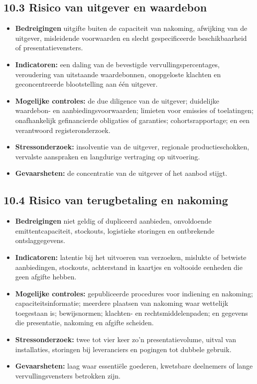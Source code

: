 \documentclass[11pt]{article}
\begin{document}
\subsection*{10.3 Risico van uitgever en waardebon}

\begin{itemize}[leftmargin=*]
\item \textbf{Bedreigingen} uitgifte buiten de capaciteit van nakoming, afwijking van de uitgever, misleidende voorwaarden en slecht gespecificeerde beschikbaarheid of presentatievensters.
\item \textbf{Indicatoren:} een daling van de bevestigde vervullingspercentages, veroudering van uitstaande waardebonnen, onopgeloste klachten en geconcentreerde blootstelling aan één uitgever.
\item \textbf{Mogelijke controles:} de due diligence van de uitgever; duidelijke waardebon- en aanbiedingsvoorwaarden; limieten voor emissies of toelatingen; onafhankelijk gefinancierde obligaties of garanties; cohortsrapportage; en een verantwoord registeronderzoek.
\item \textbf{Stressonderzoek:} insolventie van de uitgever, regionale productieschokken, vervalste aanspraken en langdurige vertraging op uitvoering.
\item \textbf{Gevaarsheten:} de concentratie van de uitgever of het aanbod stijgt.
\end{itemize}
\subsection*{10.4 Risico van terugbetaling en nakoming}

\begin{itemize}[leftmargin=*]
\item \textbf{Bedreigingen} niet geldig of dupliceerd aanbieden, onvoldoende emittentcapaciteit, stockouts, logistieke storingen en ontbrekende ontslaggegevens.
\item \textbf{Indicatoren:} latentie bij het uitvoeren van verzoeken, mislukte of betwiste aanbiedingen, stockouts, achterstand in kaartjes en voltooide eenheden die geen afgifte hebben.
\item \textbf{Mogelijke controles:} gepubliceerde procedures voor indiening en nakoming; capaciteitsinformatie; meerdere plaatsen van nakoming waar wettelijk toegestaan is; bewijsnormen; klachten- en rechtsmiddelenpaden; en gegevens die presentatie, nakoming en afgifte scheiden.
\item \textbf{Stressonderzoek:} twee tot vier keer zo'n presentatievolume, uitval van installaties, storingen bij leveranciers en pogingen tot dubbele gebruik.
\item \textbf{Gevaarsheten:} laag waar essentiële goederen, kwetsbare deelnemers of lange vervullingsvensters betrokken zijn.
\end{itemize}
\end{document}
